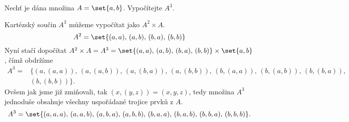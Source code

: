\begin{example}
    Nechť je dána množina $A=\set{a,b}$. Vypočítejte $A^3$.
\end{example}
\begin{solution}
    Kartézský součin $A^3$ můžeme vypočítat jako $A^2\times A$.
    \begin{equation*}
        A^2=\set{(a,a),\,(a,b),\,(b,a),\,(b,b)}
    \end{equation*}
    Nyní stačí dopočítat $A^2\times A=A^3=\set{(a,a),\,(a,b),\,(b,a),\,(b,b)}\times\set{a,b}$, čímž obdržíme
    \begin{align*}
        A^3=&\{(a,(a,a)),\,(a,(a,b)),\,(a,(b,a)),\,(a,(b,b)),\,(b,(a,a)),\,(b,(a,b)),\,(b,(b,a)),\\
        &(b,(b,b))\}.
    \end{align*}
    Ovšem jak jsme již zmiňovali, tak $(x,(y,z))=(x,y,z)$, tedy množina $A^3$ jednoduše obsahuje všechny uspořádané trojice prvků z $A$.
    \begin{equation*}
        A^3=\set{(a,a,a),\,(a,a,b),\,(a,b,a),\,(a,b,b),\,(b,a,a),\,(b,a,b),\,(b,b,a),\,(b,b,b)}.
    \end{equation*}
\end{solution}

